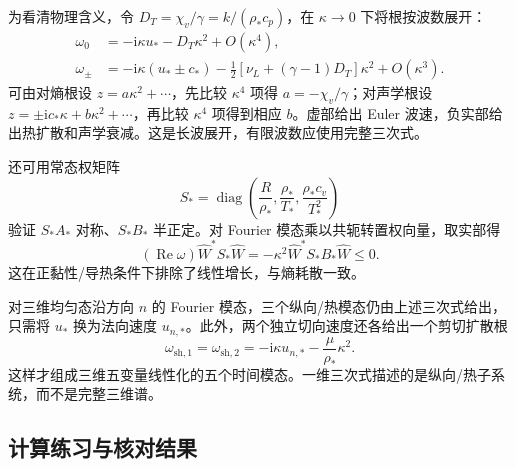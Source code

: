 为看清物理含义，令 $D_T=\chi_v/\gamma=k/(\rho_*c_p)$，在 $\kappa\to0$ 下将根按波数展开：
\begin{align}
 \omega_0&=-\mathrm i\kappa u_*-D_T\kappa^2+O(\kappa^4),\\
 \omega_\pm&=-\mathrm i\kappa(u_*\pm c_*)
 -\frac12[\nu_L+(\gamma-1)D_T]\kappa^2+O(\kappa^3).
\end{align}
可由对熵根设 $z=a\kappa^2+\cdots$，先比较 $\kappa^4$ 项得 $a=-\chi_v/\gamma$；对声学根设 $z=\pm\mathrm ic_*\kappa+b\kappa^2+\cdots$，再比较 $\kappa^4$ 项得到相应 $b$。虚部给出 Euler 波速，负实部给出热扩散和声学衰减。这是长波展开，有限波数应使用完整三次式。

还可用常态权矩阵
\begin{equation}
 S_*=\operatorname{diag}\left(\frac R{\rho_*},\frac{\rho_*}{T_*},
 \frac{\rho_*c_v}{T_*^2}\right)
\end{equation}
验证 $S_*A_*$ 对称、$S_*B_*$ 半正定。对 Fourier 模态乘以共轭转置权向量，取实部得
\begin{equation}
 (\operatorname{Re}\omega)\widehat W^*S_*\widehat W
 =-\kappa^2\widehat W^*S_*B_*\widehat W\le0.
\end{equation}
这在正黏性/导热条件下排除了线性增长，与熵耗散一致。

对三维均匀态沿方向 $n$ 的 Fourier 模态，三个纵向/热模态仍由上述三次式给出，只需将 $u_*$ 换为法向速度 $u_{n,*}$。此外，两个独立切向速度还各给出一个剪切扩散根
\begin{equation}
 \omega_{\mathrm{sh},1}=\omega_{\mathrm{sh},2}
 =-\mathrm i\kappa u_{n,*}-\frac\mu{\rho_*}\kappa^2.
\end{equation}
这样才组成三维五变量线性化的五个时间模态。一维三次式描述的是纵向/热子系统，而不是完整三维谱。

\subsection{计算练习与核对结果}

